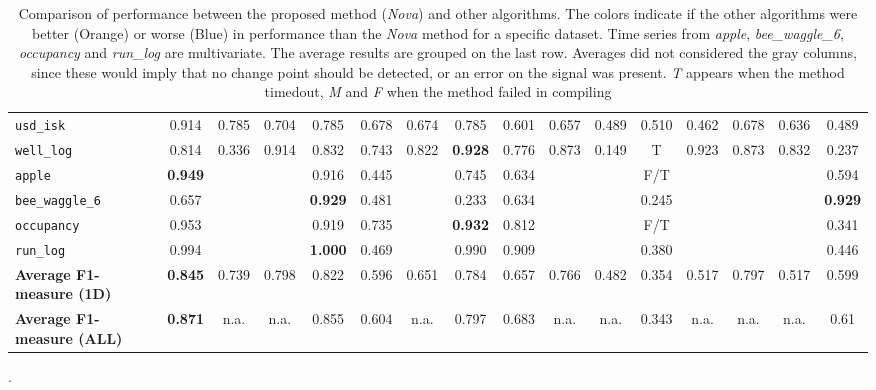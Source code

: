 \begin{table*}[h!]
\begin{adjustbox}{width=\textwidth}
\begin{tabular}{l|c|cccccccccccccc}
    \verb+usd_isk+ & \cellcolor{cyan!20}0.914 & 0.785 & 0.704 & 0.785 & 0.678 & 0.674 & 0.785 & 0.601 & 0.657 & 0.489 & 0.510 & 0.462 & 0.678 & 0.636 & 0.489\\
    
    \verb+well_log+ & \cellcolor{orange!10}0.814 & 0.336 & 0.914 & 0.832 & 0.743 & 0.822 & \textbf{0.928} & 0.776 & 0.873 & 0.149 & T & 0.923 & 0.873 & 0.832 & 0.237\\
    
    \hline
    
    \verb+apple+ & \cellcolor{cyan!03}\textbf{0.949} &  &  & 0.916 & 0.445 &  & 0.745 & 0.634 &  &  & F/T &  &  &  & 0.594\\
    
    \verb+bee_waggle_6+ & \cellcolor{orange!28}0.657 &  &  & \textbf{0.929} & 0.481 &  & 0.233 & 0.634 &  &  & 0.245 &  &  &  & \textbf{0.929}\\
    
    \verb+occupancy+ & \cellcolor{cyan!02}0.953 &  &  & 0.919 & 0.735 &  & \textbf{0.932} & 0.812 &  &  & F/T &  &  &  & 0.341\\
    
    \verb+run_log+ & 0.994 &  &  & \textbf{1.000} & 0.469 &  & 0.990 & 0.909 &  &  & 0.380 &  &  &  & 0.446\\
    
    \bottomrule
    
    \textbf{Average F1-measure (1D)} & \cellcolor{cyan!05}\textbf{0.845} & 0.739 & 0.798 & 0.822 & 0.596 & 0.651 & 0.784 & 0.657 & 0.766 & 0.482 & 0.354 & 0.517 & 0.797 & 0.517 & 0.599\\
    
    \bottomrule
    
    \textbf{Average F1-measure (ALL)} & \cellcolor{cyan!05}\textbf{0.871} & n.a. & n.a. & 0.855 & 0.604 & n.a. & 0.797 & 0.683 & n.a. & n.a. & 0.343 & n.a. & n.a. & n.a. & 0.61
    \end{tabular}
\end{adjustbox}
    \caption{Comparison of performance between the proposed method (\textit{Nova}) and other algorithms. The colors indicate if the other algorithms were better (Orange) or worse (Blue) in performance than the \textit{Nova} method for a specific dataset. Time series from \textit{apple}, \textit{bee\_waggle\_6}, \textit{occupancy} and \textit{run\_log} are multivariate. The average results are grouped on the last row. Averages did not considered the gray columns, since these would imply that no change point should be detected, or an error on the signal was present. \textit{T} appears when the method timedout, \textit{M} and \textit{F} when the method failed in compiling}.
    \label{tab:alanturing}
\end{table*}

